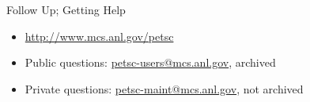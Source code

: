 \begin{frame}{Follow Up; Getting Help}
  \begin{itemize}
    \item \url{http://www.mcs.anl.gov/petsc}
    \item Public questions: \url{petsc-users@mcs.anl.gov}, archived
    \item Private questions: \url{petsc-maint@mcs.anl.gov}, not archived
  \end{itemize}
\end{frame}
